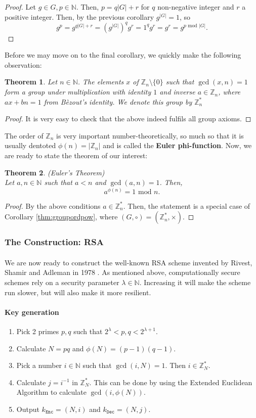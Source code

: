 \documentclass{article}
\newtheorem{theorem}{Theorem}[section]
\theoremstyle{definition}
\newcommand{\Enc}{\texttt{Enc}}
\newcommand{\Dec}{\texttt{Dec}}
\newcommand{\Int}{\mathbb{Z}}
\newcommand{\Nat}{\mathbb{N}}
\renewcommand{\mod}{\,\,\text{mod}\,\,}
\begin{document}
\begin{proof}
  \label{thm:grouppowmod}
  Let $g \in G, p \in \Nat$. Then, $p = q|G| + r$ for $q$ non-negative integer
  and $r$ a positive integer. Then, by the previous corollary $g^{|G|} = 1$, so
  \[
    g^p = g^{q|G| + r} = (g^{|G|})^qg^r = 1^qg^r= g^r = g^{p \mod |G|}.
  \]
\end{proof}
Before we may move on to the final corollary, we quickly make the following
observation:
\begin{theorem}
  Let $n \in \Nat$. The elements $x$ of $\Int_n \setminus \{0\}$ such that $\gcd(x, n) = 1$ form
  a group under multiplication with identity $1$ and inverse $a \in \Int_n$,
  where $ax + bn = 1$ from B\`ezout's identity. We denote this group by $\Int^*_n$
\end{theorem}
\begin{proof}
  It is very easy to check that the above indeed fulfils all group axioms.
\end{proof}
The order of $\Int_n$ is very important number-theoretically, so much so that it
is usually dentoted $\phi(n) = |\Int_n|$ and is called the \textbf{Euler phi-function}.
Now, we are ready to state the theorem of our interest:
\begin{theorem}{(Euler's Theorem)}\\
  \label{thm:eulersthm}
  Let $a, n \in \Nat$ such that $a < n$ and $\gcd(a, n) = 1$. Then,
  \[
    a^{\phi(n)} = 1 \mod n.
  \]
\end{theorem}
\begin{proof}
  By the above conditions $a \in \Int^*_n$. Then, the statement is a special
  case of Corollary \ref{thm:groupordpow}, where $(G, \circ) = (\Int^*_n, \times)$.
\end{proof}
\subsubsection{The Construction: RSA}
\paragraph{}
We are now ready to construct the well-known RSA scheme invented by Rivest,
Shamir and Adleman in 1978 \cite{rivest1978method}. As mentioned above, computationally secure schemes rely on
a security parameter $\lambda \in \Nat$. Increasing it will make the scheme run
slower, but will also make it more resilient.
\paragraph{Key generation}
\begin{enumerate}
\item Pick 2 primes $p, q$ such that $2^\lambda < p, q <
2^{\lambda + 1}$.
\item Calculate $N = pq$ and $\phi(N) = (p - 1)(q - 1)$.
\item Pick a number $i \in \Nat$ such that $\gcd(i, N) = 1$. Then $i \in
  \Int^*_N$.
\item Calculate $j = i^{-1}$ in $\Int^*_N$. This can be done by using the
  Extended Euclidean Algorithm to calculate $\gcd(i, \phi(N))$.
\item Output $k_\Enc = (N, i)$ and $k_\Dec = (N, j)$.
\end{enumerate}
\end{document}

